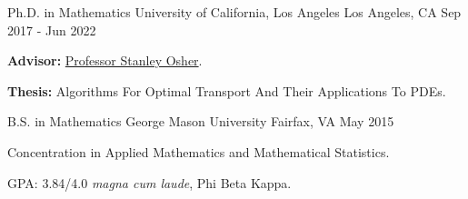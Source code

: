 

\begin{cventries}

  \cventry
    {Ph.D. in Mathematics} %
    {University of California, Los Angeles} %
    {Los Angeles, CA} %
    {Sep 2017 - Jun 2022} %
    {
      \begin{cvitems} %
        \item {\textbf{Advisor:} \href{https://www.math.ucla.edu/~sjo/}{Professor Stanley Osher}.}
        \item {\textbf{Thesis:} Algorithms For Optimal Transport And Their Applications To PDEs.}
      \end{cvitems}
    }
    
  \cventry
    {B.S. in Mathematics} %
    {George Mason University} %
    {Fairfax, VA} %
    {May 2015} %
    {\begin{cvitems} %
      \item Concentration in Applied Mathematics and Mathematical Statistics.
      \item GPA: 3.84/4.0 \textit{magna cum laude}, Phi Beta Kappa.
    \end{cvitems}
    }
    
\end{cventries}
